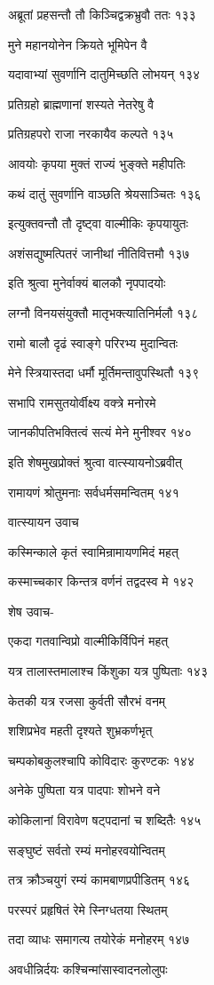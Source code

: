 अब्रूतां प्रहसन्तौ तौ किञ्चिद्वक्रभ्रुवौ ततः १३३

मुने महानयोनेन क्रियते भूमिपेन वै

यदावाभ्यां सुवर्णानि दातुमिच्छति लोभयन् १३४

प्रतिग्रहो ब्राह्मणानां शस्यते नेतरेषु वै

प्रतिग्रहपरो राजा नरकायैव कल्पते १३५

आवयोः कृपया मुक्तं राज्यं भुङ्क्ते महीपतिः

कथं दातुं सुवर्णानि वाञ्छति श्रेयसाञ्चितः १३६

इत्युक्तवन्तौ तौ दृष्ट्वा वाल्मीकिः कृपयायुतः

अशंसद्युष्मत्पितरं जानीथां नीतिवित्तमौ १३७

इति श्रुत्वा मुनेर्वाक्यं बालकौ नृपपादयोः

लग्नौ विनयसंयुक्तौ मातृभक्त्यातिनिर्मलौ १३८

रामो बालौ दृढं स्वाङ्गे परिरभ्य मुदान्वितः

मेने स्त्रियास्तदा धर्मौ मूर्तिमन्तावुपस्थितौ १३९

सभापि रामसुतयोर्वीक्ष्य वक्त्रे मनोरमे

जानकीपतिभक्तित्वं सत्यं मेने मुनीश्वर १४०

इति शेषमुखप्रोक्तं श्रुत्वा वात्स्यायनोऽब्रवीत्

रामायणं श्रोतुमनाः सर्वधर्मसमन्वितम् १४१

वात्स्यायन उवाच

कस्मिन्काले कृतं स्वामिन्रामायणमिदं महत्

कस्माच्चकार किन्तत्र वर्णनं तद्वदस्व मे १४२

शेष उवाच-

एकदा गतवान्विप्रो वाल्मीकिर्विपिनं महत्

यत्र तालास्तमालाश्च किंशुका यत्र पुष्पिताः १४३

केतकी यत्र रजसा कुर्वती सौरभं वनम्

शशिप्रभेव महती दृश्यते शुभ्रकर्णभृत्

चम्पकोबकुलश्चापि कोविदारः कुरण्टकः १४४

अनेके पुष्पिता यत्र पादपाः शोभने वने

कोकिलानां विरावेण षट्पदानां च शब्दितैः १४५

सङ्घुष्टं सर्वतो रम्यं मनोहरवयोन्वितम्

तत्र क्रौञ्चयुगं रम्यं कामबाणप्रपीडितम् १४६

परस्परं प्रहृषितं रेमे स्निग्धतया स्थितम्

तदा व्याधः समागत्य तयोरेकं मनोहरम् १४७

अवधीन्निर्दयः कश्चिन्मांसास्वादनलोलुपः

